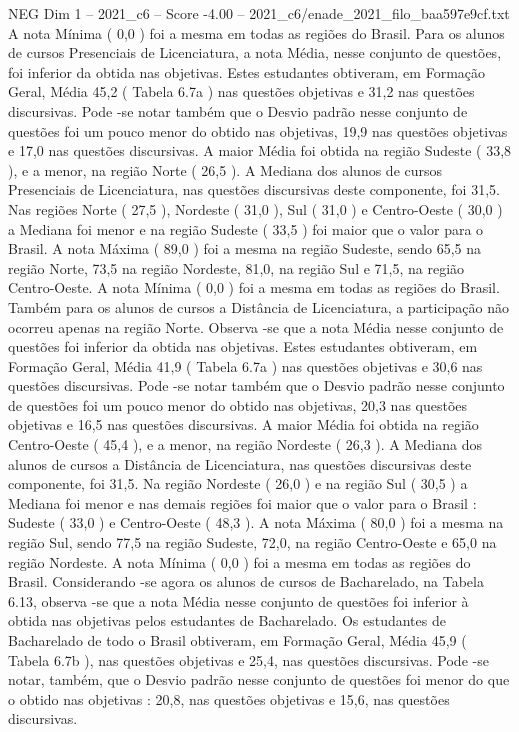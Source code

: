 \begin{textsample}{NEG Dim 1 – 2021\_c6 – Score -4.00 – 2021\_c6/enade\_2021\_filo\_baa597e9cf.txt}
A nota Mínima ( 0,0 ) foi a mesma em todas as regiões do Brasil.
Para os alunos de cursos Presenciais de Licenciatura, a nota Média, nesse conjunto de questões, foi inferior da obtida nas objetivas.
Estes estudantes obtiveram, em Formação Geral, Média 45,2 ( Tabela 6.7a ) nas questões objetivas e 31,2 nas questões discursivas.
Pode -se notar também que o Desvio padrão nesse conjunto de questões foi um pouco menor do obtido nas objetivas, 19,9 nas questões objetivas e 17,0 nas questões discursivas.
A maior Média foi obtida na região Sudeste ( 33,8 ), e a menor, na região Norte ( 26,5 ).
A Mediana dos alunos de cursos Presenciais de Licenciatura, nas questões discursivas deste componente, foi 31,5.
Nas regiões Norte ( 27,5 ), Nordeste ( 31,0 ), Sul ( 31,0 ) e Centro-Oeste ( 30,0 ) a Mediana foi menor e na região Sudeste ( 33,5 ) foi maior que o valor para o Brasil.
A nota Máxima ( 89,0 ) foi a mesma na região Sudeste, sendo 65,5 na região Norte, 73,5 na região Nordeste, 81,0, na região Sul e 71,5, na região Centro-Oeste.
A nota Mínima ( 0,0 ) foi a mesma em todas as regiões do Brasil.
Também para os alunos de cursos a Distância de Licenciatura, a participação não ocorreu apenas na região Norte.
Observa -se que a nota Média nesse conjunto de questões foi inferior da obtida nas objetivas.
Estes estudantes obtiveram, em Formação Geral, Média 41,9 ( Tabela 6.7a ) nas questões objetivas e 30,6 nas questões discursivas.
Pode -se notar também que o Desvio padrão nesse conjunto de questões foi um pouco menor do obtido nas objetivas, 20,3 nas questões objetivas e 16,5 nas questões discursivas.
A maior Média foi obtida na região Centro-Oeste ( 45,4 ), e a menor, na região Nordeste ( 26,3 ).
A Mediana dos alunos de cursos a Distância de Licenciatura, nas questões discursivas deste componente, foi 31,5.
Na região Nordeste ( 26,0 ) e na região Sul ( 30,5 ) a Mediana foi menor e nas demais regiões foi maior que o valor para o Brasil : Sudeste ( 33,0 ) e Centro-Oeste ( 48,3 ).
A nota Máxima ( 80,0 ) foi a mesma na região Sul, sendo 77,5 na região Sudeste, 72,0, na região Centro-Oeste e 65,0 na região Nordeste.
A nota Mínima ( 0,0 ) foi a mesma em todas as regiões do Brasil.
Considerando -se agora os alunos de cursos de Bacharelado, na Tabela 6.13, observa -se que a nota Média nesse conjunto de questões foi inferior à obtida nas objetivas pelos estudantes de Bacharelado.
Os estudantes de Bacharelado de todo o Brasil obtiveram, em Formação Geral, Média 45,9 ( Tabela 6.7b ), nas questões objetivas e 25,4, nas questões discursivas.
Pode -se notar, também, que o Desvio padrão nesse conjunto de questões foi menor do que o obtido nas objetivas : 20,8, nas questões objetivas e 15,6, nas questões discursivas.

\end{textsample}
